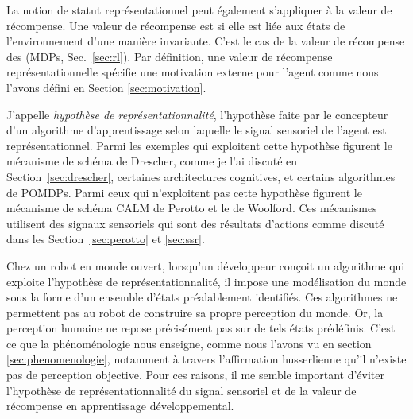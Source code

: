 La notion de statut représentationnel peut également s'appliquer à la valeur de récompense. 
Une valeur de récompense est  si elle est liée aux états de l'environnement d'une manière invariante.
C'est le cas de la valeur de récompense des  (MDPs, Sec.~\ref{sec:rl}).
Par définition, une valeur de récompense représentationnelle spécifie une motivation externe pour l'agent comme nous l'avons défini en Section \ref{sec:motivation}.   


J'appelle \emph{hypothèse de représentationnalité}, l'hypothèse faite par le concepteur d'un algorithme d'apprentissage selon laquelle le signal sensoriel de l'agent est représentationnel.
Parmi les exemples qui exploitent cette hypothèse figurent le mécanisme de schéma de Drescher, comme je l'ai discuté en Section~\ref{sec:drescher}, certaines architectures cognitives, et certains algorithmes de POMDPs. 
Parmi ceux qui n'exploitent pas cette hypothèse figurent le mécanisme de schéma CALM de Perotto et le  de Woolford. 
Ces mécanismes utilisent des signaux sensoriels qui sont des résultats d'actions comme discuté dans les  Section~\ref{sec:perotto} et \ref{sec:ssr}. 

Chez un robot en monde ouvert, lorsqu'un développeur conçoit un algorithme qui exploite l'hypothèse de représentationnalité, il impose une modélisation du monde sous la forme d'un ensemble d'états préalablement identifiés.
Ces algorithmes ne permettent pas au robot de construire sa propre perception du monde.
Or, la perception humaine ne repose précisément pas sur de tels états prédéfinis. 
C'est ce que la phénoménologie nous enseigne, comme nous l'avons vu en section \ref{sec:phenomenologie}, notamment à travers l'affirmation husserlienne qu'il n'existe pas de perception objective. 
Pour ces raisons, il me semble important d'éviter l'hypothèse de représentationnalité du signal sensoriel et de la valeur de récompense en apprentissage développemental.




